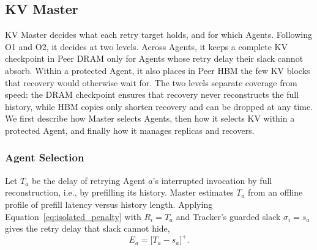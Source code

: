 \subsection{KV Master}
\label{sec:master}

KV Master decides what each retry target holds, and for which Agents.
Following O1 and O2, it decides at two levels. Across Agents, it keeps a
complete KV checkpoint in Peer DRAM only for Agents whose retry delay
their slack cannot absorb. Within a protected Agent, it also places in
Peer HBM the few KV blocks that recovery would otherwise wait for. The two
levels separate coverage from speed: the DRAM checkpoint ensures that
recovery never reconstructs the full history, while HBM copies only
shorten recovery and can be dropped at any time. We first describe how
Master selects Agents, then how it selects KV within a protected Agent,
and finally how it manages replicas and recovers.

\subsubsection{Agent Selection}
\label{sec:agent-protection}

Let $T_a$ be the delay of retrying Agent $a$'s interrupted invocation by
full reconstruction, i.e., by prefilling its history. Master estimates
$T_a$ from an offline profile of prefill latency versus history length.
Applying Equation~\ref{eq:isolated_penalty} with $R_i=T_a$ and Tracker's
guarded slack $\sigma_i=s_a$ gives the retry delay that slack cannot hide,
\begin{equation}
 E_a=\bigl[T_a-s_a\bigr]^+.
 \label{eq:exposed-delay}
\end{equation}

